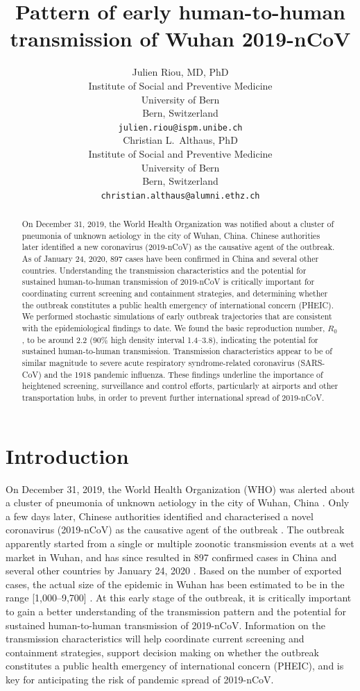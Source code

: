 \documentclass{article}
\title{Pattern of early human-to-human transmission of Wuhan 2019-nCoV}
\author{
   Julien Riou, MD, PhD \\
  Institute of Social and Preventive Medicine\\
  University of Bern\\
  Bern, Switzerland \\
  \texttt{julien.riou@ispm.unibe.ch} \\
  \And
Christian L.~Althaus, PhD \\
Institute of Social and Preventive Medicine\\
University of Bern\\
Bern, Switzerland \\
\texttt{christian.althaus@alumni.ethz.ch}
}
\begin{document}
\maketitle

\begin{abstract}
On December 31, 2019, the World Health Organization was notified about a cluster of pneumonia of unknown aetiology in the city of Wuhan, China. Chinese authorities later identified a new coronavirus (2019-nCoV) as the causative agent of the outbreak. As of January 24, 2020, 897 cases have been confirmed in China and several other countries. Understanding the transmission characteristics and the potential for sustained human-to-human transmission of 2019-nCoV is critically important for coordinating current screening and containment strategies, and determining whether the outbreak constitutes a public health emergency of international concern (PHEIC). We performed stochastic simulations of early outbreak trajectories that are consistent with the epidemiological findings to date. We found the basic reproduction number, $R_0$, to be around 2.2 (90\% high density interval 1.4--3.8), indicating the potential for sustained human-to-human transmission. Transmission characteristics appear to be of similar magnitude to severe acute respiratory syndrome-related coronavirus (SARS-CoV) and the 1918 pandemic influenza. These findings underline the importance of heightened screening, surveillance and control efforts, particularly at airports and other transportation hubs, in order to prevent further international spread of 2019-nCoV.
\end{abstract}

\section*{Introduction}

On December 31, 2019, the World Health Organization (WHO) was alerted about a cluster of pneumonia of unknown aetiology in the city of Wuhan, China \cite{who1}. Only a few days later, Chinese authorities identified and characterised a novel coronavirus (2019-nCoV) as the causative agent of the outbreak \cite{Shi:2020}. The outbreak apparently started from a single or multiple zoonotic transmission events at a wet market in Wuhan, and has since resulted in 897 confirmed cases in China and several other countries by January 24, 2020 \cite{wiki}. 
Based on the number of exported cases, the actual size of the epidemic in Wuhan has been estimated to be in the range [1,000--9,700] \cite{Imai:2020}.
At this early stage of the outbreak, it is critically important to gain a better understanding of the transmission pattern and the potential for sustained human-to-human transmission of 2019-nCoV. Information on the transmission characteristics will help coordinate current screening and containment strategies, support decision making on whether the outbreak constitutes a public health emergency of international concern (PHEIC), and is key for anticipating the risk of pandemic spread of 2019-nCoV.
\end{document}

